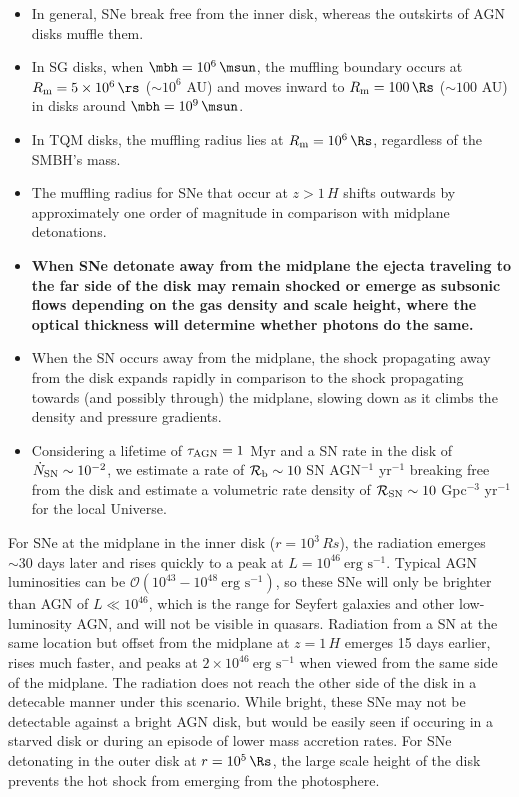 \begin{itemize}
    \item In general, SNe break free from the inner disk, whereas the outskirts of AGN disks muffle them.
    \item In SG disks, when $\mbh=10^6\,\msun$, the muffling boundary occurs at $R_{\rm m}=5\times10^6\,\rs$ ($\sim10^6$ AU) and moves inward to $R_{\rm m}=100\,\Rs$ ($\sim100$ AU) in disks around $\mbh=10^9\,\msun$.
    \item In TQM disks, the muffling radius lies at $R_{\rm m}=10^6\,\Rs$, regardless of the SMBH's mass.
    \item The muffling radius for SNe that occur at $z>1\,H$ shifts outwards by approximately one order of magnitude in comparison with midplane detonations.
    \item \textbf{When SNe detonate away from the midplane the ejecta traveling to the far side of the disk may remain shocked or emerge as subsonic flows depending on the gas density and scale height, where the optical thickness will determine whether photons do the same.}
    \item When the SN occurs away from the midplane, the shock propagating away from the disk expands rapidly in comparison to the shock propagating towards (and possibly through) the midplane, slowing down as it climbs the density and pressure gradients.
    \item Considering a lifetime of $\tau_{\rm AGN}=1$ Myr and a SN rate in the disk of $\dot{N}_{\rm SN} \sim 10^{-2}$, we estimate a rate of $\mathcal{R}_{\rm b} \sim 10$ SN AGN$^{-1}$ yr$^{-1}$ breaking free from the disk and estimate a volumetric rate density of $\mathcal{R}_{\rm SN} \sim 10$ Gpc$^{-3}$ yr$^{-1}$ for the local Universe.
\end{itemize}

For SNe at the midplane in the inner disk ($r=10^3\,Rs$), the radiation emerges $\sim30$ days later and rises quickly to a peak at $L=10^{46}\ \text{erg s}^{-1}$.
Typical AGN luminosities can be $\mathcal{O}(10^{43}-10^{48}\ \text{erg s}^{-1})$, so these SNe will only be brighter than AGN of $L\ll10^{46}$, which is the range for Seyfert galaxies and other low-luminosity AGN, and will not be visible in quasars.
Radiation from a SN at the same location but offset from the midplane at $z=1\,H$ emerges 15 days earlier, rises much faster, and peaks at $2 \times 10^{46}\ \text{erg s}^{-1}$ when viewed from the same side of the midplane.
The radiation does not reach the other side of the disk in a detecable manner under this scenario.
While bright, these SNe may not be detectable against a bright AGN disk, but would be easily seen if occuring in a starved disk or during an episode of lower mass accretion rates.
For SNe detonating in the outer disk at $r=10^5\,\Rs$, the large scale height of the disk prevents the hot shock from emerging from the photosphere.

